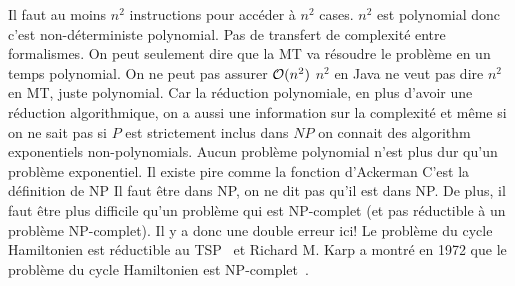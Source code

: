\begin{mcqs}
  {Il faut au moins $n^2$ instructions pour accéder à $n^2$ cases.}
  {}
  {}
  {$n^2$ est polynomial donc c'est non-déterministe polynomial.}
  {Pas de transfert de complexité entre formalismes. On peut seulement dire que la MT va résoudre le problème en un temps polynomial. On ne peut pas assurer $\mathcal{O}(n^{2})$}
  {$n^2$ en Java ne veut pas dire $n^2$ en MT, juste polynomial.}
  {Car la réduction polynomiale, en plus d’avoir une réduction algorithmique, on a aussi une information sur la complexité
  et même si on ne sait pas si $P$ est strictement inclus dans $NP$ on connait des algorithm exponentiels non-polynomials.}
  {Aucun problème polynomial n'est plus dur qu'un problème exponentiel.}
  {Il existe pire comme la fonction d'Ackerman}
  {C'est la définition de NP}
  {Il faut être dans NP, on ne dit pas qu'il est dans NP. De plus, il faut être plus difficile qu'un problème qui est NP-complet (et pas réductible à un problème NP-complet). Il y a donc une double erreur ici!}
  {Le problème du cycle Hamiltonien est réductible au TSP~\cite[Theorem~34.14]{cormen2009algorithm} et Richard M. Karp a montré en 1972 que le problème du cycle Hamiltonien est NP-complet~\cite[Theorem~34.13]{cormen2009algorithm}.}
\end{mcqs}
